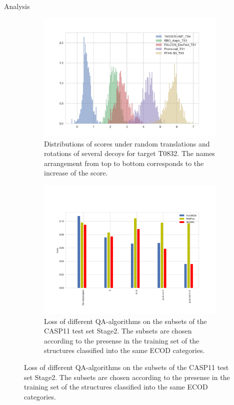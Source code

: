 \documentclass[final, unknownkeysallowed]{beamer}
\begin{document}
\begin{frame}{}
\begin{textblock}{39.0}
\begin{block}{Analysis}
\begin{figure}[H]
    \centering
    \begin{subfigure}{.5\textwidth}
    \includegraphics[width=\linewidth]{../draft/Fig/decoys_sampling_dist.png}
    \captionsetup{width=\linewidth}
    \caption{Distributions of scores under random translations and
      rotations of several decoys for target T0832. The names
      arrangement from top to bottom corresponds to the increase of
      the score.}
    \label{Fig:DecoysScoreDistribution}
    \end{subfigure}%
    \begin{subfigure}{.5\textwidth}
    \includegraphics[width=\linewidth]{../draft/Fig/LossVsECOD.png}
    \captionsetup{width=\linewidth}
    \caption{Loss of different QA-algorithms on the subsets of the
      CASP11 test set Stage2. The subsets are chosen according to the
      presense in the training set of the structures classified into
      the same ECOD categories.}
    \label{Fig:LossVsECOD}
    \end{subfigure}
\end{figure}


\end{block}
\end{textblock}
\end{frame}
\end{document}
